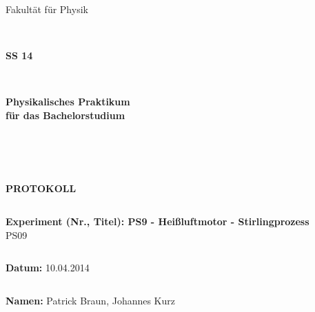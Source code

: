 \documentclass[12pt,a4paper]{article}
\begin{document}
\thispagestyle{empty}
			\begin{center}
			\Large{Fakultät für Physik}\\
			\end{center}
\begin{verbatim}


\end{verbatim}
			\begin{center}
			\textbf{\LARGE SS 14}
			\end{center}
\begin{verbatim}


\end{verbatim}
			\begin{center}
			\textbf{\LARGE{Physikalisches Praktikum\\ für das Bachelorstudium}}
			\end{center}
\begin{verbatim}




\end{verbatim}

			\begin{center}
			\textbf{\LARGE{PROTOKOLL}}
			\end{center}
			
\begin{verbatim}

\end{verbatim}

			\begin{flushleft}
			\textbf{\Large{Experiment (Nr., Titel): PS9 - Heißluftmotor - Stirlingprozess}}\\
			\LARGE{PS09 }	
			\end{flushleft}

\begin{verbatim}

\end{verbatim}	
			\begin{flushleft}
			\textbf{\Large{Datum:}} \Large{10.04.2014}
			\end{flushleft}
			
\begin{verbatim}
\end{verbatim}
		\begin{flushleft}
			\textbf{\Large{Namen:}} \Large{Patrick Braun, Johannes Kurz}
			\end{flushleft}
\end{document}
